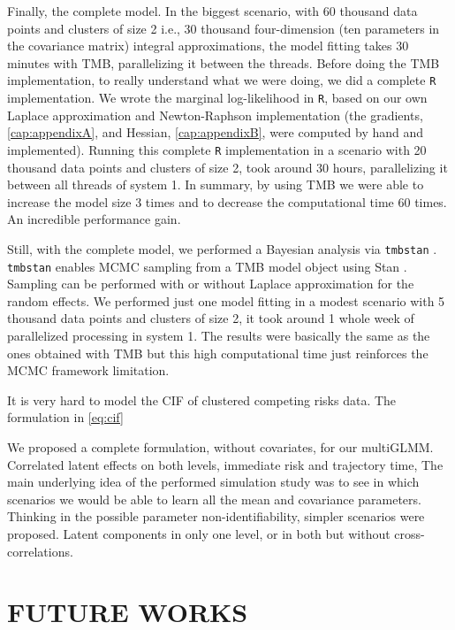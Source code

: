 Finally, the complete model. In the biggest scenario, with 60 thousand
data points and clusters of size 2 i.e., 30 thousand four-dimension (ten
parameters in the covariance matrix) integral approximations, the model
fitting takes 30 minutes with TMB, parallelizing it between the
threads. Before doing the TMB implementation, to really understand what
we were doing, we did a complete \texttt{R} implementation. We wrote the
marginal log-likelihood in \texttt{R}, based on our own Laplace
approximation and Newton-Raphson implementation (the gradients,
\autoref{cap:appendixA}, and Hessian, \autoref{cap:appendixB}, were
computed by hand and implemented). Running this complete \texttt{R}
implementation in a scenario with 20 thousand data points and clusters
of size 2, took around 30 hours, parallelizing it between all threads of
system 1. In summary, by using TMB we were able to increase the model
size 3 times and to decrease the computational time 60 times. An
incredible performance gain.

Still, with the complete model, we performed a Bayesian analysis via
\texttt{tmbstan} \cite{tmbstan}. \texttt{tmbstan} enables MCMC sampling
\cite{MCMC, Diaconis} from a TMB model object using Stan \cite{Stan,
RStan}. Sampling can be performed with or without Laplace approximation
for the random effects. We performed just one model fitting in a modest
scenario with 5 thousand data points and clusters of size 2, it took
around 1 whole week of parallelized processing in system 1. The results
were basically the same as the ones obtained with TMB but this high
computational time just reinforces the MCMC framework limitation.

It is very hard to model the CIF of clustered competing risks data. The
formulation in \autoref{eq:cif}

We proposed a complete formulation, without covariates, for our
multiGLMM. Correlated latent effects on both levels, immediate risk and
trajectory time, The main underlying idea of the performed simulation
study was to see in which scenarios we would be able to learn all the
mean and covariance parameters. Thinking in the possible parameter
non-identifiability, simpler scenarios were proposed. Latent components
in only one level, or in both but without cross-correlations.

\section{FUTURE WORKS}
\label{cap:future}

